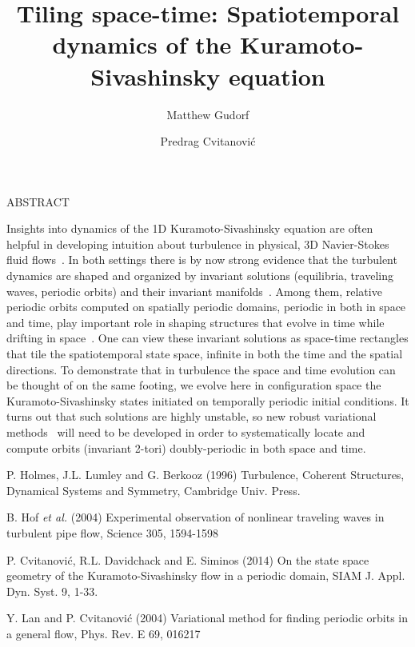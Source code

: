 \documentclass[11pt]{article}
\title{Tiling space-time: Spatiotemporal dynamics of the Kuramoto-Sivashinsky
	   equation}
\date{}
\author[1]{Matthew Gudorf}
\author[1]{Predrag Cvitanovi\'{c}}
\affil[1]{School of Physics and Center for Nonlinear Science,
		  Georgia Inst. of Technology,
		  Atlanta, GA  30332, USA \emailaddress{matthew.gudorf@gatech.edu}}
\newcommand{\smalllineskip}{\baselineskip=15pt}
\renewenvironment{abstract}[0]{\small\rm
        \begin{center}ABSTRACT
        \\ \vspace{8pt}
        \begin{minipage}{5.2in}\smalllineskip
        \hspace{1pc}}{\end{minipage}\end{center}\vspace{-1pt}}
\begin{document}
\maketitle

\begin{abstract}
Insights into dynamics of the 1D Kuramoto-Sivashinsky equation are often
helpful in developing intuition about turbulence in physical, 3D
Navier-Stokes fluid flows~\cite{Holmes96}. In both settings there is by now
strong evidence that the turbulent dynamics are shaped and organized by
invariant solutions (equilibria, traveling waves, periodic orbits) and their
invariant manifolds~\cite{science04}. Among them, relative periodic orbits
computed on spatially periodic domains, periodic in both in space and time,
play important role in shaping structures that evolve in time while drifting
in space~\cite{SCD07}. One can view these invariant solutions as space-time
rectangles that tile the spatiotemporal state space, infinite in both the
time and the spatial directions. To demonstrate that in turbulence the space
and time evolution can be thought of on the same footing, we evolve here in
configuration space the Kuramoto-Sivashinsky states initiated on temporally
periodic initial conditions. It turns out that such solutions are highly
unstable, so new robust variational methods~\cite{lanVar1} will need to be
developed in order to systematically locate and compute orbits (invariant
2-tori) doubly-periodic in both space and time.

\end{abstract}

\begin{thebibliography}{99}
\small
{} P. Holmes, J.L. Lumley and G. Berkooz (1996)
Turbulence, Coherent Structures, Dynamical Systems and Symmetry,
Cambridge Univ. Press.

B. Hof {\em et al.} (2004)
Experimental observation of nonlinear traveling waves in turbulent pipe flow,
 Science 305, 1594-1598

%

  P. Cvitanovi{\'c},  R.L. Davidchack and E. Siminos (2014)
  On the state space geometry of the Kuramoto-Sivashinsky flow in a periodic domain,
  SIAM J. Appl. Dyn. Syst. 9, 1-33.

 Y. Lan and P. Cvitanovi\'c (2004)
 Variational method for finding periodic orbits in a general flow,
 Phys. Rev. E 69, 016217
\end{thebibliography}
\end{document}

